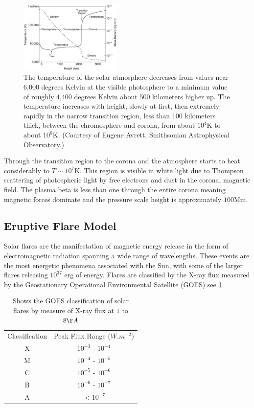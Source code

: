 \documentclass[11pt]{article}
\begin{document}
\begin{figure}
    \includegraphics[width=0.45\textwidth]{solar-atm-plot}
\caption{The temperature of the solar atmosphere decreases from values near 6,000 degrees Kelvin at the visible photosphere to a minimum value of roughly 4,400 degrees Kelvin about 500 kilometers higher up. The temperature increases with height, slowly at first, then extremely rapidly in the narrow transition region, less than 100 kilometers thick, between the chromosphere and corona, from about $10^{4}$K to about $10^{6}$K. (Courtesy of Eugene Avrett, Smithsonian Astrophysical Observatory.) }\label{solatm}
\end{figure}

Through the transition region to the corona and the atmosphere starts to heat considerably to $T\sim10^{7}$K. This region is visible in white light due to Thompson scattering of photospheric light by free electrons and dust in the coronal magnetic field. The plasma beta is less than one through the entire corona meaning magnetic forces dominate and the pressure scale height is approximately $100$Mm.  

\subsection{Eruptive Flare Model}\label{EFM}
Solar flares are the manifestation of magnetic energy release in the form of electromagnetic radiation spanning a wide range of wavelengths. These events are the most energetic phenomena associated with the Sun, with some of the larger flares releasing $10^{37}$ erg of energy. Flares are classified by the X-ray flux measured by the Geostationary Operational Environmental Satellite (GOES) see \ref{GOES}.

\begin{table}[h]

\centering
\begin{tabular}{|c|c|}
Classification & Peak Flux Range ($W.m^{-2}$)\\ 
X & $10^{-3}$ - $10^{-4}$\\ 
M & $10^{-4}$ - $10^{-5}$\\ 
C & $10^{-5}$ - $10^{-6}$\\ 
B & $10^{-6}$ - $10^{-7}$\\ 
A & $<10^{-7}$\\  
\end{tabular}
\caption{Shows the GOES classification of solar flares by measure of X-ray flux at $1$ to $8\AA$}\label{GOES}
\end{table}
\end{document}
